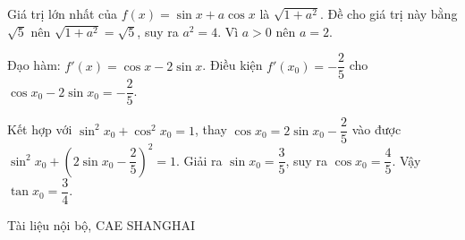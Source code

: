\documentclass[11pt, a4paper]{article}
\begin{document}
Giá trị lớn nhất của $f(x) = \sin x + a\cos x$ là $\sqrt{1 + a^2}$. Đề cho giá trị này bằng $\sqrt{5}$ nên $\sqrt{1 + a^2} = \sqrt{5}$, suy ra $a^2 = 4$. Vì $a > 0$ nên $a = 2$.

Đạo hàm: $f'(x) = \cos x - 2\sin x$. Điều kiện $f'(x_0) = -\dfrac{2}{5}$ cho $\cos x_0 - 2\sin x_0 = -\dfrac{2}{5}$.

 Kết hợp với $\sin^2 x_0 + \cos^2 x_0 = 1$, thay $\cos x_0 = 2\sin x_0 - \dfrac{2}{5}$ vào được $\sin^2 x_0 + \left(2\sin x_0 - \dfrac{2}{5}\right)^2 = 1$. Giải ra $\sin x_0 = \dfrac{3}{5}$, suy ra $\cos x_0 = \dfrac{4}{5}$. Vậy $\tan x_0 = \dfrac{3}{4}$.
\vspace{0.8cm}
\begin{center}
{\footnotesize\color{cae_blue} Tài liệu nội bộ, CAE SHANGHAI}
\end{center}
\end{document}
